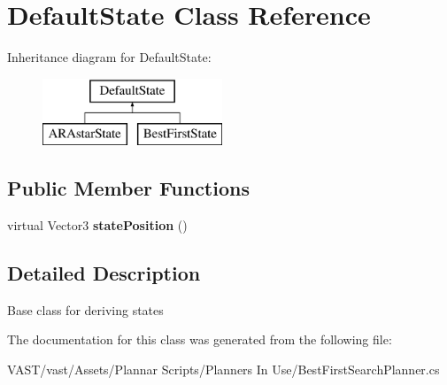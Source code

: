 \hypertarget{class_default_state}{\section{Default\-State Class Reference}
\label{class_default_state}
}
Inheritance diagram for Default\-State\-:\begin{figure}[H]
\begin{center}
\leavevmode
\includegraphics[height=2.000000cm]{class_default_state}
\end{center}
\end{figure}
\subsection*{Public Member Functions}
\begin{DoxyCompactItemize}
\item 
\hypertarget{class_default_state_a3091716e0c5026f23b55f1b377f27b6a}{virtual Vector3 {\bfseries state\-Position} ()}\label{class_default_state_a3091716e0c5026f23b55f1b377f27b6a}

\end{DoxyCompactItemize}


\subsection{Detailed Description}
Base class for deriving states 

The documentation for this class was generated from the following file\-:\begin{DoxyCompactItemize}
\item 
V\-A\-S\-T/vast/\-Assets/\-Plannar Scripts/\-Planners In Use/Best\-First\-Search\-Planner.\-cs\end{DoxyCompactItemize}
